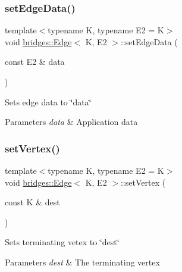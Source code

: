 \subsubsection{\texorpdfstring{set\+Edge\+Data()}{setEdgeData()}}
{\footnotesize\ttfamily template$<$typename K, typename E2 = K$>$ \\
void \mbox{\hyperlink{classbridges_1_1_edge}{bridges\+::\+Edge}}$<$ K, E2 $>$\+::set\+Edge\+Data (\begin{DoxyParamCaption}\item[{const E2 \&}]{data }\end{DoxyParamCaption})\hspace{0.3cm}{\ttfamily [inline]}}

Sets edge data to \char`\"{}data\char`\"{} 
\begin{DoxyParams}{Parameters}
{\em data} & Application data \\
\hline
\end{DoxyParams}
\mbox{\label{classbridges_1_1_edge_a6818ee110efa9db2b16323ee443e9ab2}} 
\subsubsection{\texorpdfstring{set\+Vertex()}{setVertex()}}
{\footnotesize\ttfamily template$<$typename K, typename E2 = K$>$ \\
void \mbox{\hyperlink{classbridges_1_1_edge}{bridges\+::\+Edge}}$<$ K, E2 $>$\+::set\+Vertex (\begin{DoxyParamCaption}\item[{const K \&}]{dest }\end{DoxyParamCaption})\hspace{0.3cm}{\ttfamily [inline]}}

Sets terminating vetex to \char`\"{}dest\char`\"{}


\begin{DoxyParams}{Parameters}
{\em dest} & The terminating vertex \\
\hline
\end{DoxyParams}
\mbox{\label{classbridges_1_1_edge_a7f6a9e983490b32d698de7310ffa28c0}} 
